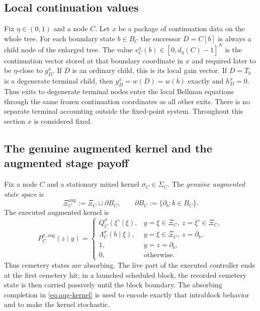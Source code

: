 \documentclass[12pt]{article}
\theoremstyle{definition}
\newcommand{\1}{\mathbf{1}}
\begin{document}
\subsection{Local continuation values}

Fix $\eta\in(0,1)$ and a node $C$. Let $x$ be a package of continuation data on the
whole tree. For each boundary state $b\in B_C$ the successor $D=C[b]$ is always a
child node of the enlarged tree. The value
$v_C^x(b)\in[0,d_\eta(C)-1]^N$ is the continuation vector stored at that boundary
coordinate in $x$ and required later to be $\eta$-close to $g_D^x$. If $D$ is an
ordinary child, this is its local gain vector. If $D=T_b$ is a degenerate
terminal child, then $g_D^x=w(D)=w(b)$ exactly and $h_D^x=0$. Thus exits to
degenerate terminal nodes enter the local Bellman equations through the same
frozen continuation coordinates as all other exits. There is no separate
terminal accounting outside the fixed-point system. Throughout this section $x$
is considered fixed.

\subsection{The genuine augmented kernel and the augmented stage payoff}

Fix a node $C$ and a stationary mixed kernel $\sigma_C\in\Sigma_C$. The
\emph{genuine augmented state space} is
\[
\Xi_C^{\mathrm{aug}}:=\Xi_C\sqcup \partial B_C,
\qquad
\partial B_C:=\{\partial_b:b\in B_C\}.
\]
The executed augmented kernel is
\begin{equation}
\label{eq:aug-kernel}
P_C^{\sigma,\mathrm{aug}}(z\mid y)
=
\begin{cases}
Q_C^{\sigma}(\xi'\mid \xi), & y=\xi\in\Xi_C,\ z=\xi'\in\Xi_C,\\[0.3em]
\Lambda_C^{\sigma}(b\mid \xi), & y=\xi\in\Xi_C,\ z=\partial_b,\\[0.3em]
1, & y=z=\partial_b,\\[0.3em]
0, & \text{otherwise.}
\end{cases}
\end{equation}
Thus cemetery states are absorbing. The live part of the executed controller ends
at the first cemetery hit; in a launched scheduled block, the recorded cemetery
state is then carried passively until the block boundary. The absorbing
completion in \eqref{eq:aug-kernel} is used to encode exactly that intrablock
behavior and to make the kernel stochastic.
\end{document}
